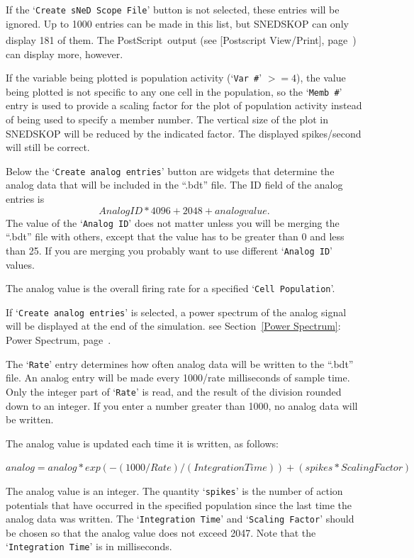 \documentclass[12pt,openany,oneside]{book}
\newcommand{\tiw}[1]{\mbox{#1}}
\newcommand{\tisamp}[1]{`\texttt{#1}'}
\newcommand{\tixref}[1]{see Section~\ref{#1}: #1, page~\pageref{#1}}
\newcommand{\tipxref}[1]{see [#1], page~\pageref{#1}}
\newcommand{\registeredsymbol}{\textsuperscript{\textregistered}}
\begin{document}
\noindent
If the \tisamp{Create sNeD Scope File} button is not selected, these
entries will be ignored.  Up to 1000 entries can be made in this list,
but SNEDSKOP can only display 181 of them.  The
PostScript\registeredsymbol\ output (\tipxref{Postscript View/Print})
can display more, however.

If the variable being plotted is population activity (\tisamp{Var \#} $>=
4$), the value being plotted is not specific to any one cell in the
population, so the \tisamp{Memb \#} entry is used to provide a scaling
factor for the plot of population activity instead of being used to
specify a member number.  The vertical size of the plot in SNEDSKOP
will be reduced by the indicated factor.  The displayed spikes/second
will still be correct.

Below the \tisamp{Create analog entries} button are widgets that
determine the analog data that will be included in the ``.bdt'' file.
The ID field of the analog entries is \[Analog ID * 4096 + 2048 +
analog value.\]  The value of the \tisamp{Analog ID} does not matter
unless you will be merging the ``.bdt'' file with others, except that
the value has to be greater than 0 and less than 25.  If you are
merging you probably want to use different \tisamp{Analog ID} values.

The analog value is the overall firing rate for a specified \tisamp{Cell
Population}.

If \tisamp{Create analog entries} is selected, a power spectrum of the
analog signal will be displayed at the end of the simulation.
\tixref{Power Spectrum}.

The \tisamp{Rate} entry determines how often analog data will be written
to the ``.bdt'' file.  An analog entry will be made every 1000/rate
milliseconds of sample time.  Only the integer part of \tisamp{Rate} is
read, and the result of the division rounded down to an integer.  If
you enter a number greater than 1000, no analog data will be written.

The analog value is updated each time it is written, as follows:

\noindent
\tiw{$analog = analog * exp(-(1000/Rate)/(Integration Time)) +
(spikes * Scaling Factor)$}

\noindent
The analog value is an integer.  The
quantity \tisamp{spikes} is the number of action potentials that have
occurred in the specified population since the last time the analog
data was written.  The \tisamp{Integration Time} and \tisamp{Scaling
Factor} should be chosen so that the analog value does not exceed
2047.  Note that the \tisamp{Integration Time} is in milliseconds.
\end{document}
